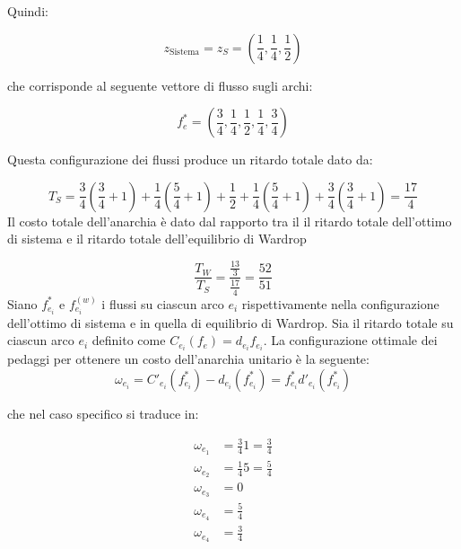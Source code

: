 \documentclass[11pt,largemargins]{homework}
\begin{document}
\begin{alphaparts}
  Quindi:

  \begin{equation*}
    z_{\text{Sistema}}=z_S=\left(\frac{1}{4},\frac{1}{4},\frac{1}{2}\right)
  \end{equation*}

  che corrisponde al seguente vettore di flusso sugli archi:

  \begin{equation*}
    f_e^{*}=\left(\frac{3}{4}, \frac{1}{4}, \frac{1}{2}, \frac{1}{4}, \frac{3}{4}\right)
  \end{equation*}

  Questa configurazione dei flussi produce un ritardo totale dato da:

  \begin{equation*}
    T_S=\frac{3}{4}\left(\frac{3}{4}+1\right)+\frac{1}{4}\left(\frac{5}{4}+1\right)+\frac{1}{2}+\frac{1}{4}\left(\frac{5}{4}+1\right)+\frac{3}{4}\left(\frac{3}{4}+1\right)= \frac{17}{4}
  \end{equation*}
  \questionpart
  Il costo totale dell'anarchia è dato dal rapporto tra il il ritardo totale dell'ottimo di sistema e il ritardo totale dell'equilibrio di Wardrop

  \begin{equation*}
    \frac{T_W}{T_S}=\frac{\frac{13}{3}}{\frac{17}{4}}=\frac{52}{51}
  \end{equation*}
  \questionpart
  Siano \(f^*_{e_i}\) e \(f^{(w)}_{e_i}\) i flussi su ciascun arco \(e_i\) rispettivamente nella configurazione dell'ottimo di sistema e in quella di equilibrio di Wardrop. Sia il ritardo totale su ciascun arco \(e_i\) definito come \(C_{e_i}(f_e)=d_{e_i}f_{e_i}\). La configurazione ottimale dei pedaggi per ottenere un costo dell'anarchia unitario è la seguente:
  \begin{equation*}
    \omega_{e_i}=C'_{e_i}(f^*_{e_i})-d_{e_i}(f^*_{e_i})=f^*_{e_i}d'_{e_i}(f^*_{e_i})
  \end{equation*} 

  che nel caso specifico si traduce in:

  \begin{align*}
    \omega_{e_1}&=\frac{3}{4} 1=\frac{3}{4}\\
    \omega_{e_2}&=\frac{1}{4} 5=\frac{5}{4}\\
    \omega_{e_3}&=0\\
    \omega_{e_4}&=\frac{5}{4}\\
    \omega_{e_4}&=\frac{3}{4}\\
  \end{align*}

  \end{alphaparts}
\end{document}
